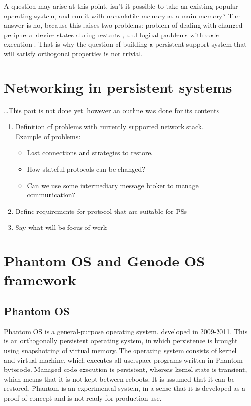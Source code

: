 A question may arise at this point, isn't it possible to take an existing 
popular operating system, and run it with nonvolatile memory as a main memory?
The answer is no, because this raises two problems: problem of dealing with 
changed peripheral device states during restarts \cite{berthou2018peripheral}, 
and logical problems with code execution \cite{ransford2014nonvolatile}. That is
why the question of building a persistent support system that will satisfy 
orthogonal properties is not trivial. 

\section{Networking in persistent systems}
\dots This part is not done yet, however an outline was done for its contents
\begin{enumerate}
    \item Definition of problems with currently supported network stack. \\
    Example of problems:
    \begin{itemize}
        \item Lost connections and strategies to restore. 
        \item How stateful protocols can be changed? 
        \item Can we use some intermediary message broker to manage communication?
    \end{itemize} 
    \item Define requirements for protocol that are suitable for PSs
    \item Say what will be focus of work
\end{enumerate} 

\section{Phantom OS and Genode OS framework}
\subsection{Phantom OS}
Phantom OS is a general-purpose operating system, developed in 2009-2011. This 
is an orthogonally persistent operating system, in which persistence is brought
using snapshotting of virtual memory. The operating system consists of kernel 
and virtual machine, which executes all userspace programs written in Phantom 
bytecode. Managed code execution is persistent, whereas kernel state is 
transient, which means that it is not kept between reboots. It is assumed that 
it can be restored. 
Phantom is an experimental system, in a sense that it is developed as a 
proof-of-concept and is not ready for production use.

